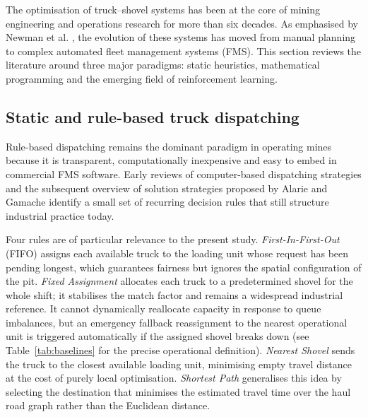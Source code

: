 \documentclass[11pt,a4paper]{article}
\begin{document}
The optimisation of truck--shovel systems has been at the core of mining engineering and operations research for more than six decades. As emphasised by Newman et al. \cite{AlexandraNewman2010}, the evolution of these systems has moved from manual planning to complex automated fleet management systems (FMS). This section reviews the literature around three major paradigms: static heuristics, mathematical programming and the emerging field of reinforcement learning.

\subsection{Static and rule-based truck dispatching}

Rule-based dispatching remains the dominant paradigm in operating mines because it is transparent, computationally inexpensive and easy to embed in commercial FMS software. Early reviews of computer-based dispatching strategies \cite{MohanMunirathinam1994} and the subsequent overview of solution strategies proposed by Alarie and Gamache \cite{Alarie2002} identify a small set of recurring decision rules that still structure industrial practice today.

Four rules are of particular relevance to the present study. \textit{First-In-First-Out} (FIFO) assigns each available truck to the loading unit whose request has been pending longest, which guarantees fairness but ignores the spatial configuration of the pit. \textit{Fixed Assignment} allocates each truck to a predetermined shovel for the whole shift; it stabilises the match factor and remains a widespread industrial reference. It cannot dynamically reallocate capacity in response to queue imbalances, but an emergency fallback reassignment to the nearest operational unit is triggered automatically if the assigned shovel breaks down (see Table~\ref{tab:baselines} for the precise operational definition). \textit{Nearest Shovel} sends the truck to the closest available loading unit, minimising empty travel distance at the cost of purely local optimisation. \textit{Shortest Path} generalises this idea by selecting the destination that minimises the estimated travel time over the haul road graph rather than the Euclidean distance.
\end{document}
